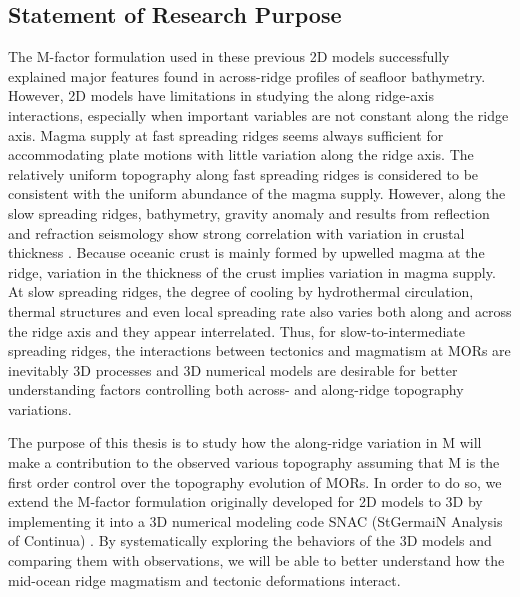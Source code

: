 \subsection{Statement of Research Purpose}
The M-factor formulation used in these previous 2D models successfully explained major features found in across-ridge profiles of seafloor bathymetry. However, 2D models have limitations in studying the along ridge-axis interactions, especially when important variables are not constant along the ridge axis. Magma supply at fast spreading ridges seems always sufficient for accommodating plate motions with little variation along the ridge axis. The relatively uniform topography along fast spreading ridges is considered to be consistent with the uniform abundance of the magma supply. However, along the slow spreading ridges, bathymetry, gravity anomaly and results from reflection and refraction seismology show strong correlation with variation in crustal thickness \citep{Ryan2009, Chen1999, Lin1990, Tolstoy1993}. Because oceanic crust is mainly formed by upwelled magma at the ridge, variation in the thickness of the crust implies variation in magma supply. At slow spreading ridges, the degree of cooling by hydrothermal circulation, thermal structures and even local spreading rate \citep{Baines2008} also varies both along and across the ridge axis and they appear interrelated. Thus, for slow-to-intermediate spreading ridges, the interactions between tectonics and magmatism at MORs are inevitably 3D processes and 3D numerical models are desirable for better understanding factors controlling both across- and along-ridge topography variations. 

The purpose of this thesis is to study how the along-ridge variation in M will make a contribution to the observed various topography assuming that M is the first order control over the topography evolution of MORs. In order to do so, we extend the M-factor formulation originally developed for 2D models to 3D by implementing it into a 3D numerical modeling code SNAC (StGermaiN Analysis of Continua) \citep{Choi2008}. By systematically exploring the behaviors of the 3D models and comparing them with observations, we will be able to better understand how the mid-ocean ridge magmatism and tectonic deformations interact. 


